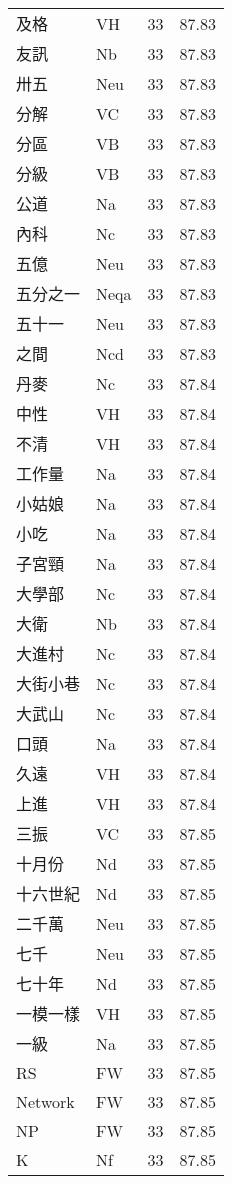 \documentclass[twocolumn]{book}
\begin{document}
\begin{supertabular}{llrr}
及格 & VH & 33 &  87.83\\
友訊 & Nb & 33 &  87.83\\
卅五 & Neu & 33 &  87.83\\
分解 & VC & 33 &  87.83\\
分區 & VB & 33 &  87.83\\
分級 & VB & 33 &  87.83\\
公道 & Na & 33 &  87.83\\
內科 & Nc & 33 &  87.83\\
五億 & Neu & 33 &  87.83\\
五分之一 & Neqa & 33 &  87.83\\
五十一 & Neu & 33 &  87.83\\
之間 & Ncd & 33 &  87.83\\
丹麥 & Nc & 33 &  87.84\\
中性 & VH & 33 &  87.84\\
不清 & VH & 33 &  87.84\\
工作量 & Na & 33 &  87.84\\
小姑娘 & Na & 33 &  87.84\\
小吃 & Na & 33 &  87.84\\
子宮頸 & Na & 33 &  87.84\\
大學部 & Nc & 33 &  87.84\\
大衛 & Nb & 33 &  87.84\\
大進村 & Nc & 33 &  87.84\\
大街小巷 & Nc & 33 &  87.84\\
大武山 & Nc & 33 &  87.84\\
口頭 & Na & 33 &  87.84\\
久遠 & VH & 33 &  87.84\\
上進 & VH & 33 &  87.84\\
三振 & VC & 33 &  87.85\\
十月份 & Nd & 33 &  87.85\\
十六世紀 & Nd & 33 &  87.85\\
二千萬 & Neu & 33 &  87.85\\
七千 & Neu & 33 &  87.85\\
七十年 & Nd & 33 &  87.85\\
一模一樣 & VH & 33 &  87.85\\
一級 & Na & 33 &  87.85\\
RS & FW & 33 &  87.85\\
Network & FW & 33 &  87.85\\
NP & FW & 33 &  87.85\\
K & Nf & 33 &  87.85\\

\end{supertabular}
\end{document}
